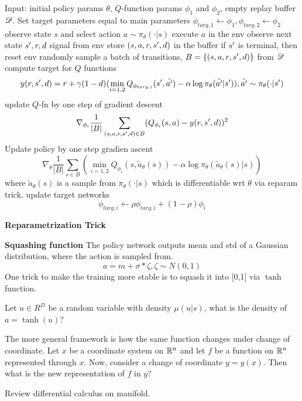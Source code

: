 \documentclass{article}
\begin{document}
\begin{algorithmic}
\STATE Input: initial policy params $\theta$, $Q$-function params 
$\phi_1$ and $\phi_2$, empty replay buffer $\mathscr{D}$.
\STATE Set target parameters equal to main parameters 
    $\phi_{targ,1}\leftarrow \phi_1, \phi_{targ,2}\leftarrow \phi_2$
\REPEAT
    \STATE observe state $s$ and select action 
    $a\sim\pi_{\theta}(\cdot|s)$
    \STATE execute $a$ in the env
    \STATE observe next state $s^{\prime}, r, d$ signal from env
    \STATE store $(s,a,r,s^{\prime},d)$ in the buffer
    \STATE if $s^{\prime}$ is terminal, then reset env
            \STATE randomly sample a batch of transitions, 
            $B=\{(s,a,r,s^{\prime},d)\}$ from $\mathscr{D}$
            \STATE compute target for $Q$ functions
            \[
                y(r,s^{\prime},d) = r + \gamma(1-d)(\min_{i=1,2}
                Q_{\phi_{targ,i}}(s^{\prime},\tilde{a^{\prime}})
                - \alpha \log \pi_{\theta}(\tilde{a^{\prime}}|s^{\prime})),
                \tilde {a^{\prime}} \sim \pi_{\theta}(\cdot|s^{\prime})
            \]
            \STATE update $Q$-fn by one step of gradient descent
            \[
                \nabla_{\phi_i}\frac{1}{|B|}
                \sum_{(s,a,r,s^{\prime},d)\in B}
                (Q_{\phi_i}(s,a) - y(r,s^{\prime},d))^2
            \]
            \STATE Update policy by one step gradien ascent
            \[
                \nabla_{\theta}\frac{1}{|B|}
                \sum_{s\in B}(\min_{i=1,2}
                Q_{\phi_i}(s,\tilde a_{\theta}(s)) - 
                \alpha\log\pi_{\theta}(\tilde a_{\theta}(s)|s))
            \]
            where $\tilde a_{\theta}(s)$ is a sample from
            $\pi_{\theta}(\cdot|s)$ which is differentiable wrt $\theta$
            via reparam trick.
            \STATE update target networks
            \[
                \phi_{targ,i}\leftarrow \rho\phi_{targ,i} + 
                (1-\rho)\phi_i
            \]
        \ENDFOR
    \ENDIF
{}
\end{algorithmic}

\textbf{Reparametrization Trick}

\textbf{Squashing function} The policy network outputs mean and std of a
Gaussian distribution, where the action is sampled from. 
\[
    a = m + \sigma * \zeta, \zeta \sim N(0, 1)
\]
One trick to make the training more stable is to squash it into [0,1] 
via $\tanh$ function. 

Let $u \in R^{D}$ be a random variable with density $\mu(u|s)$, what is 
the density of $a = \tanh(u)$?

The more general framework is how the same function changes under 
change of coordinate. 
Let $x$ be a coordinate system on $\mathbb{R}^n$ and let $f$ be a function on 
$\mathbb{R}^n$ represented through $x$. Now, consider a change of coordinate
$y = y(x)$. Then what is the new representation of $f$ in $y$?

Review differential calculus on manifold.
\end{document}
